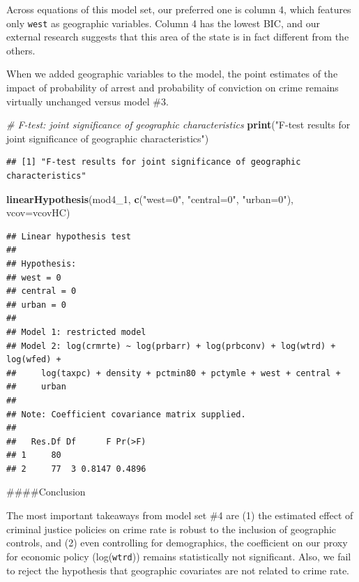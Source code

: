 \documentclass[]{article}
\newenvironment{Shaded}{\begin{snugshade}}{\end{snugshade}}
\newcommand{\CommentTok}[1]{\textcolor[rgb]{0.56,0.35,0.01}{\textit{#1}}}
\newcommand{\DataTypeTok}[1]{\textcolor[rgb]{0.13,0.29,0.53}{#1}}
\newcommand{\DecValTok}[1]{\textcolor[rgb]{0.00,0.00,0.81}{#1}}
\newcommand{\KeywordTok}[1]{\textcolor[rgb]{0.13,0.29,0.53}{\textbf{#1}}}
\newcommand{\NormalTok}[1]{#1}
\newcommand{\StringTok}[1]{\textcolor[rgb]{0.31,0.60,0.02}{#1}}
\begin{document}
Across equations of this model set, our preferred one is column 4, which
features only \texttt{west} as geographic variables. Column 4 has the
lowest BIC, and our external research suggests that this area of the
state is in fact different from the others.

When we added geographic variables to the model, the point estimates of
the impact of probability of arrest and probability of conviction on
crime remains virtually unchanged versus model \#3.

\begin{Shaded}
\begin{Highlighting}[]
\CommentTok{# F-test: joint significance of geographic characteristics}
\KeywordTok{print}\NormalTok{(}\StringTok{"F-test results for joint significance of geographic characteristics"}\NormalTok{) }
\end{Highlighting}
\end{Shaded}

\begin{verbatim}
## [1] "F-test results for joint significance of geographic characteristics"
\end{verbatim}

\begin{Shaded}
\begin{Highlighting}[]
\KeywordTok{linearHypothesis}\NormalTok{(mod4_}\DecValTok{1}\NormalTok{, }\KeywordTok{c}\NormalTok{(}\StringTok{"west=0"}\NormalTok{, }\StringTok{"central=0"}\NormalTok{, }\StringTok{"urban=0"}\NormalTok{), }\DataTypeTok{vcov=}\NormalTok{vcovHC)}
\end{Highlighting}
\end{Shaded}

\begin{verbatim}
## Linear hypothesis test
## 
## Hypothesis:
## west = 0
## central = 0
## urban = 0
## 
## Model 1: restricted model
## Model 2: log(crmrte) ~ log(prbarr) + log(prbconv) + log(wtrd) + log(wfed) + 
##     log(taxpc) + density + pctmin80 + pctymle + west + central + 
##     urban
## 
## Note: Coefficient covariance matrix supplied.
## 
##   Res.Df Df      F Pr(>F)
## 1     80                 
## 2     77  3 0.8147 0.4896
\end{verbatim}

\#\#\#\#Conclusion

The most important takeaways from model set \#4 are (1) the estimated
effect of criminal justice policies on crime rate is robust to the
inclusion of geographic controls, and (2) even controlling for
demographics, the coefficient on our proxy for economic policy
(log(\texttt{wtrd})) remains statistically not significant. Also, we
fail to reject the hypothesis that geographic covariates are not related
to crime rate.
\end{document}
